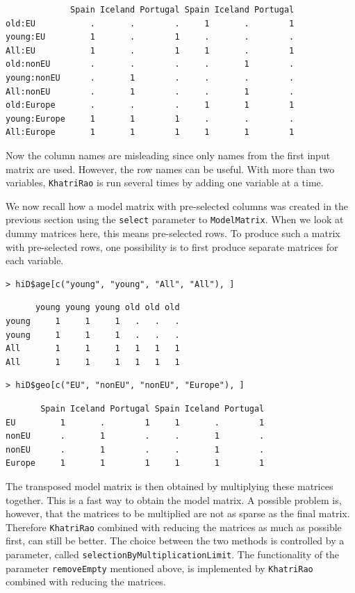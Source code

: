\begin{verbatim}
             Spain Iceland Portugal Spain Iceland Portugal
old:EU           .       .        .     1       .        1
young:EU         1       .        1     .       .        .
All:EU           1       .        1     1       .        1
old:nonEU        .       .        .     .       1        .
young:nonEU      .       1        .     .       .        .
All:nonEU        .       1        .     .       1        .
old:Europe       .       .        .     1       1        1
young:Europe     1       1        1     .       .        .
All:Europe       1       1        1     1       1        1
\end{verbatim}

Now the column names are misleading since only names from the first input matrix are used. However, the row names can be useful.
With more than two variables, \texttt{KhatriRao} is run several times by adding one variable at a time.

We now recall how a model matrix with pre-selected columns was created in the previous section using the \texttt{select} parameter to \texttt{ModelMatrix}.
When we look at dummy matrices here, this means pre-selected rows.
To produce such a matrix with pre-selected rows, one possibility is to first produce separate matrices for each variable.

\begin{verbatim}
> hiD$age[c("young", "young", "All", "All"), ]
\end{verbatim}

\begin{verbatim}
      young young young old old old
young     1     1     1   .   .   .
young     1     1     1   .   .   .
All       1     1     1   1   1   1
All       1     1     1   1   1   1
\end{verbatim}

\begin{verbatim}
> hiD$geo[c("EU", "nonEU", "nonEU", "Europe"), ]
\end{verbatim}

\begin{verbatim}
       Spain Iceland Portugal Spain Iceland Portugal
EU         1       .        1     1       .        1
nonEU      .       1        .     .       1        .
nonEU      .       1        .     .       1        .
Europe     1       1        1     1       1        1
\end{verbatim}

The transposed model matrix is then obtained by multiplying these matrices together.
This is a fast way to obtain the model matrix.
A possible problem is, however, that the matrices to be multiplied are not as sparse as the final matrix.
Therefore \texttt{KhatriRao} combined with reducing the matrices as much as possible first, can still be better.
The choice between the two methods is controlled by a parameter, called \texttt{selectionByMultiplicationLimit}.
The functionality of the parameter \texttt{removeEmpty} mentioned above, is implemented by \texttt{KhatriRao} combined with reducing the matrices.

